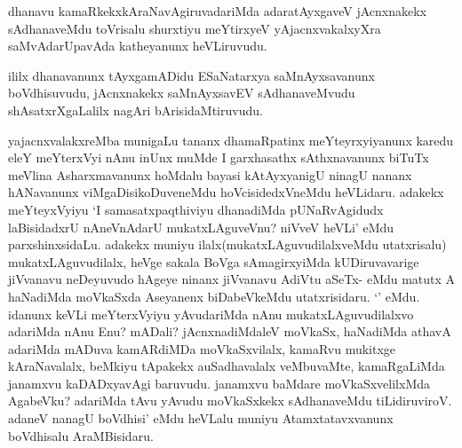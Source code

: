 \begin{center}


\end{center}

\begin{artha}

dhanavu kamaRkekxkAraNavAgiruvadariMda adaratAyxgaveV jAcnxnakekx
sAdhanaveMdu toVrisalu shurxtiyu meYtirxyeV yAjacnxvakalxyXra
saMvAdarUpavAda katheyanunx heVLiruvudu.

ililx dhanavanunx tAyxgamADidu ESaNatarxya saMnAyxsavanunx
boVdhisuvudu, jAcnxnakekx saMnAyxsavEV sAdhanaveMvudu
shAsatxrXgaLalilx nagAri bArisidaMtiruvudu.
\end{artha}

\begin{center}


\end{center}


\begin{artha}
yajacnxvalakxreMba munigaLu tananx dhamaRpatinx meYteyrxyiyanunx
karedu eleY meYterxVyi nAnu inUnx muMde I garxhasathx sAthxnavanunx
biTuTx meVlina Asharxmavanunx hoMdalu bayasi kAtAyxyanigU ninagU
nananx hANavanunx viMgaDisikoDuveneMdu hoVcisidedxVneMdu
heVLidaru. adakekx meYteyxVyiyu `I samasatxpaqthiviyu dhanadiMda
pUNaRvAgidudx laBisidadxrU nAneVnAdarU mukatxLAguveVnu? niVveV
heVLi' eMdu parxshinxsidaLu. adakekx muniyu
ilalx(mukatxLAguvudilalxveMdu utatxrisalu) mukatxLAguvudilalx, heVge
sakala BoVga sAmagirxyiMda kUDiruvavarige jiVvanavu neDeyuvudo hAgeye
ninanx jiVvanavu AdiVtu aSeTx- eMdu matutx A haNadiMda moVkaSxda
Aseyanenx biDabeVkeMdu utatxrisidaru. `\stext' eMdu. idanunx keVLi
meYterxVyiyu yAvudariMda nAnu mukatxLAguvudilalxvo adariMda nAnu Enu?
mADali? jAcnxnadiMdaleV moVkaSx, haNadiMda athavA adariMda mADuva
kamARdiMDa moVkaSxvilalx, kamaRvu mukitxge kAraNavalalx, beMkiyu
tApakekx auSadhavalalx veMbuvaMte, kamaRgaLiMda janamxvu kaDADxyavAgi
baruvudu. janamxvu baMdare moVkaSxvelilxMda AgabeVku? adariMda tAvu
yAvudu moVkaSxkekx sAdhanaveMdu tiLidiruviroV. adaneV nanagU boVdhisi'
eMdu heVLalu muniyu Atamxtatavxvanunx boVdhisalu AraMBisidaru.
\end{artha}

